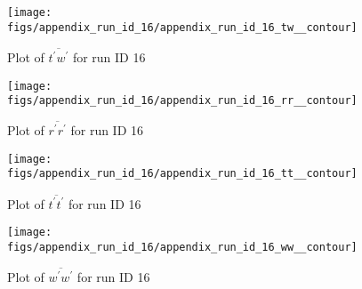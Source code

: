 \begin{figure}[H]
\centering
\texttt{[image: figs/appendix\_run\_id\_16/appendix\_run\_id\_16\_tw\_\_contour]}
\caption{Plot of $\overline{t^\prime w^\prime}$ for run ID 16}
\label{fig:appendix_run_id_16_tw__contour}
\end{figure}


\begin{figure}[H]
\centering
\texttt{[image: figs/appendix\_run\_id\_16/appendix\_run\_id\_16\_rr\_\_contour]}
\caption{Plot of $\overline{r^\prime r^\prime}$ for run ID 16}
\label{fig:appendix_run_id_16_rr__contour}
\end{figure}


\begin{figure}[H]
\centering
\texttt{[image: figs/appendix\_run\_id\_16/appendix\_run\_id\_16\_tt\_\_contour]}
\caption{Plot of $\overline{t^\prime t^\prime}$ for run ID 16}
\label{fig:appendix_run_id_16_tt__contour}
\end{figure}


\begin{figure}[H]
\centering
\texttt{[image: figs/appendix\_run\_id\_16/appendix\_run\_id\_16\_ww\_\_contour]}
\caption{Plot of $\overline{w^\prime w^\prime}$ for run ID 16}
\label{fig:appendix_run_id_16_ww__contour}
\end{figure}


